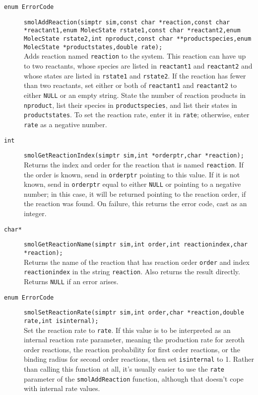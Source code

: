 \documentclass {book}
\begin{document}
\begin{description}

\item[\texttt{enum ErrorCode}]
\texttt{smolAddReaction(simptr sim,const char *reaction,const char *reactant1,enum MolecState rstate1,const char *reactant2,enum MolecState rstate2,int nproduct,const char **productspecies,enum MolecState *productstates,double rate);}
\hfill \\
Adds reaction named \texttt{reaction} to the system. This reaction can have up to two reactants, whose species are listed in \texttt{reactant1} and \texttt{reactant2} and whose states are listed in \texttt{rstate1} and \texttt{rstate2}. If the reaction has fewer than two reactants, set either or both of \texttt{reactant1} and \texttt{reactant2} to either \texttt{NULL} or an empty string. State the number of reaction products in \texttt{nproduct}, list their species in \texttt{productspecies}, and list their states in \texttt{productstates}. To set the reaction rate, enter it in \texttt{rate}; otherwise, enter \texttt{rate} as a negative number.

\item[\texttt{int}]
\texttt{smolGetReactionIndex(simptr sim,int *orderptr,char *reaction);}
\hfill \\
Returns the index and order for the reaction that is named \texttt{reaction}. If the order is known, send in \texttt{orderptr} pointing to this value. If it is not known, send in \texttt{orderptr} equal to either \texttt{NULL} or pointing to a negative number; in this case, it will be returned pointing to the reaction order, if the reaction was found. On failure, this returns the error code, cast as an integer.

\item[\texttt{char*}]
\texttt{smolGetReactionName(simptr sim,int order,int reactionindex,char *reaction);}
\hfill \\
Returns the name of the reaction that has reaction order \texttt{order} and index \texttt{reactionindex} in the string \texttt{reaction}. Also returns the result directly. Returns \texttt{NULL} if an error arises.

\item[\texttt{enum ErrorCode}]
\texttt{smolSetReactionRate(simptr sim,int order,char *reaction,double rate,int isinternal);}
\hfill \\
Set the reaction rate to \texttt{rate}. If this value is to be interpreted as an internal reaction rate parameter, meaning the production rate for zeroth order reactions, the reaction probability for first order reactions, or the binding radius for second order reactions, then set \texttt{isinternal} to 1. Rather than calling this function at all, it's usually easier to use the \texttt{rate} parameter of the \texttt{smolAddReaction} function, although that doesn't cope with internal rate values.


\end{description}
\end{document}
